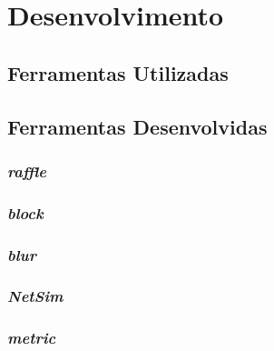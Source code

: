 \section{Desenvolvimento}

\subsection{Ferramentas Utilizadas}
    \begin{frame}\frametitle{}
    \end{frame}
    
\subsection{Ferramentas Desenvolvidas}
    \begin{frame}\frametitle{}
    \end{frame}
    
    \subsubsection{\emph{raffle}}
        \begin{frame}\frametitle{}
        \end{frame}
    
    \subsubsection{\emph{block}}
        \begin{frame}\frametitle{}
        \end{frame}
        
    \subsubsection{\emph{blur}}
        \begin{frame}\frametitle{}
        \end{frame}
        
    \subsubsection{\emph{NetSim}}
        \begin{frame}\frametitle{}
        \end{frame}
        
    \subsubsection{\emph{metric}}
        \begin{frame}\frametitle{}
        \end{frame}


